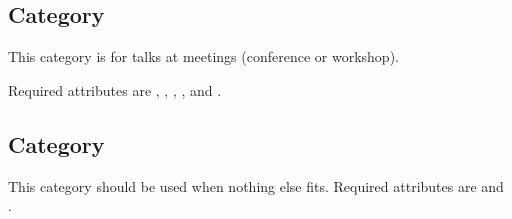 \subsection{Category }

This category is for talks at meetings (conference or workshop).

Required attributes are , , , , and .

\subsection{Category }

This category should be used when nothing else fits. Required attributes are
 and .
